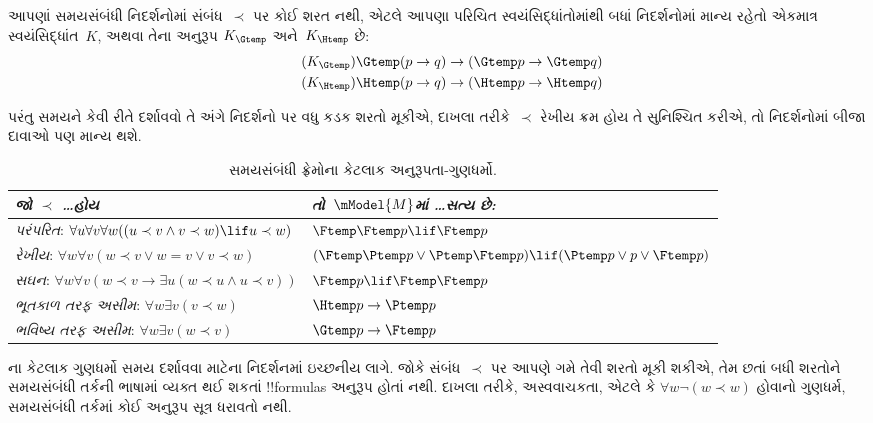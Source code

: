 \documentclass[../../../include/open-logic-section]{subfiles}
\begin{document}


આપણાં સમયસંબંધી નિદર્શનોમાં સંબંધ~$\prec$ પર કોઈ શરત નથી,
એટલે આપણા પરિચિત સ્વયંસિદ્ધાંતોમાંથી બધાં નિદર્શનોમાં માન્ય
રહેતો એકમાત્ર સ્વયંસિદ્ધાંત~$K$, અથવા તેના અનુરૂપ
$K_{\Gtemp}$ અને~$K_{\Htemp}$ છે:
\begin{align*}
\tag{$K_{\Gtemp}$}  \Gtemp (p \to q) & \to (\Gtemp p \to \Gtemp q)\\
\tag{$K_{\Htemp}$}  \Htemp (p \to q) & \to (\Htemp p \to \Htemp q)
\end{align*}

પરંતુ સમયને કેવી રીતે દર્શાવવો તે અંગે નિદર્શનો પર વધુ કડક
શરતો મૂકીએ, દાખલા તરીકે~$\prec$ રેખીય ક્રમ હોય તે સુનિશ્ચિત
કરીએ, તો નિદર્શનોમાં બીજા દાવાઓ પણ માન્ય થશે.

\begin{table}[t]
  \begin{tabular}{| p{} || p{} |}
    \hline
    {\emph{જો $\prec$ \dots હોય}} & {\emph{તો~$\mModel{M}$માં \dots સત્ય છે:}} \\
    \hline \hline
    \emph{પરંપરિત}: \newline
    $\forall u \forall v \forall w ((u \prec v \land v \prec w) \lif u \prec w)$ & 
    $\Ftemp \Ftemp p \lif \Ftemp p$  \\
    \hline 
    \emph{રેખીય}: \newline
    $\forall w \forall v (w \prec v \lor w = v \lor v \prec w)$ &  
    $(\Ftemp \Ptemp  p \lor \Ptemp \Ftemp p) \lif (\Ptemp p \lor p \lor \Ftemp p)$\\
    \hline
    \emph{સઘન}: \newline
    $\forall w \forall v (w \prec v \to \exists u(w \prec u \land u \prec v))$ &  
    $\Ftemp p \lif \Ftemp \Ftemp p$ \\
    \hline
    \emph{ભૂતકાળ તરફ અસીમ}: \newline
    $\forall w \exists v( v \prec w)$ &  
    $\Htemp p \to \Ptemp p$ \\
    \hline
    \emph{ભવિષ્ય તરફ અસીમ}: \newline
    $\forall w \exists v( w \prec v)$ &  
    $\Gtemp p \to \Ftemp p$ \\
    \hline
  \end{tabular}
  \caption{સમયસંબંધી ફ્રેમોના કેટલાક અનુરૂપતા-ગુણધર્મો.}
\end{table} 

ના કેટલાક ગુણધર્મો સમય દર્શાવવા માટેના
નિદર્શનમાં ઇચ્છનીય લાગે. જોકે સંબંધ~$\prec$ પર આપણે ગમે તેવી
શરતો મૂકી શકીએ, તેમ છતાં બધી શરતોને સમયસંબંધી તર્કની ભાષામાં
વ્યક્ત થઈ શકતાં !!{formula}s અનુરૂપ હોતાં નથી. દાખલા તરીકે,
અસ્વવાચકતા, એટલે કે $\forall w \lnot (w \prec w)$ હોવાનો
ગુણધર્મ, સમયસંબંધી તર્કમાં કોઈ અનુરૂપ સૂત્ર ધરાવતો નથી.
\end{document}
